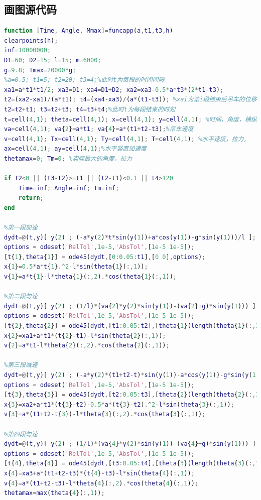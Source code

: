\documentclass[withoutpreface,bwprint]{cumcmthesis} %
\begin{document}
\begin{appendices}
     \section{画图源代码}
     \begin{lstlisting}[language=matlab]
        function [Time, Angle, Mmax]=funcapp(a,t1,t3,h)
clearpoints(h);
inf=10000000;
D1=60; D2=15; l=15; m=6000;
g=9.8; Tmax=20000*g;
%a=0.5; t1=5; t2=20; t3=4;%此时t为每段的时间间隔
xa1=a*t1*t1/2; xa3=D1; xa4=D1+D2; xa2=xa3-0.5*a*t3*(2*t1-t3);
t2=(xa2-xa1)/(a*t1); t4=(xa4-xa3)/(a*(t1-t3)); %xai为第i段结束后吊车的位移
t2=t2+t1; t3=t2+t3; t4=t3+t4;%此时t为每段结束的时刻
t=cell(4,1); theta=cell(4,1); x=cell(4,1); y=cell(4,1); %时间，角度，横纵坐标
va=cell(4,1); va{2}=a*t1; va{4}=a*(t1+t2-t3);%吊车速度
v=cell(4,1); Tx=cell(4,1); Ty=cell(4,1); T=cell(4,1); %水平速度，拉力,
ax=cell(4,1); ay=cell(4,1);%水平竖直加速度
thetamax=0; Tm=0; %实际最大的角度，拉力

if t2<0 || (t3-t2)>=t1 || (t2-t1)<0.1 || t4>120
    Time=inf; Angle=inf; Tm=inf;
    return;
end

%第一段加速
dydt=@(t,y)[ y(2) ; (-a*y(2)*t*sin(y(1))+a*cos(y(1))-g*sin(y(1)))/l ];
options = odeset('RelTol',1e-5,'AbsTol',[1e-5 1e-5]);
[t{1},theta{1}] = ode45(dydt,[0:0.05:t1],[0 0],options);
x{1}=0.5*a*t{1}.^2-l*sin(theta{1}(:,1));
v{1}=a*t{1}-l*theta{1}(:,2).*cos(theta{1}(:,1));

%第二段匀速
dydt=@(t,y)[ y(2) ; (1/l)*(va{2}*y(2)*sin(y(1))-(va{2}+g)*sin(y(1))) ];
options = odeset('RelTol',1e-5,'AbsTol',[1e-5 1e-5]);
[t{2},theta{2}] = ode45(dydt,[t1:0.05:t2],[theta{1}(length(theta{1}(:,1)),1) theta{1}(length(theta{1}(:,2)),2)],options);
x{2}=xa1+a*t1*(t{2}-t1)-l*sin(theta{2}(:,1));
v{2}=a*t1-l*theta{2}(:,2).*cos(theta{2}(:,1));

%第三段减速
dydt=@(t,y)[ y(2) ; (-a*y(2)*(t1+t2-t)*sin(y(1))-a*cos(y(1))-g*sin(y(1)))/l ];
options = odeset('RelTol',1e-5,'AbsTol',[1e-5 1e-5]);
[t{3},theta{3}] = ode45(dydt,[t2:0.05:t3],[theta{2}(length(theta{2}(:,1)),1) theta{2}(length(theta{2}(:,2)),2)],options);
x{3}=xa2+a*t1*(t{3}-t2)-0.5*a*(t{3}-t2).^2-l*sin(theta{3}(:,1));
v{3}=a*(t1+t2-t{3})-l*theta{3}(:,2).*cos(theta{3}(:,1));

%第四段匀速
dydt=@(t,y)[ y(2) ; (1/l)*(va{4}*y(2)*sin(y(1))-(va{4}+g)*sin(y(1))) ];
options = odeset('RelTol',1e-5,'AbsTol',[1e-5 1e-5]);
[t{4},theta{4}] = ode45(dydt,[t3:0.05:t4],[theta{3}(length(theta{3}(:,1)),1) theta{3}(length(theta{3}(:,2)),2)],options);
x{4}=xa3+a*(t1+t2-t3)*(t{4}-t3)-l*sin(theta{4}(:,1));
v{4}=a*(t1+t2-t3)-l*theta{4}(:,2).*cos(theta{4}(:,1));
thetamax=max(theta{4}(:,1));


\end{lstlisting}
\end{appendices}
\end{document}

